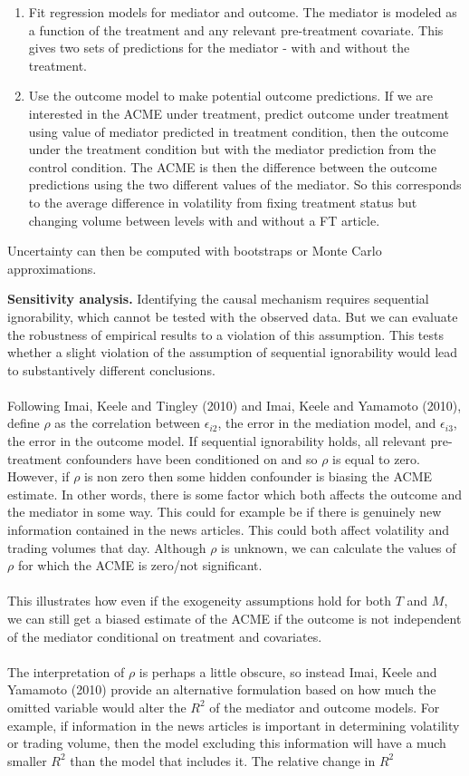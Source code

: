 \documentclass{article}
\begin{document}
	\begin{enumerate}
		\item Fit regression models for mediator and outcome. The mediator is modeled as a function of the treatment and any relevant pre-treatment covariate. This gives two sets of predictions for the mediator - with and without the treatment. 
		\item Use the outcome model to make potential outcome predictions. If we are interested in the ACME under treatment, predict outcome under treatment using value of mediator predicted in treatment condition, then the outcome under the treatment condition but with the mediator prediction from the control condition. The ACME is then the difference between the outcome predictions using the two different values of the mediator. So this corresponds to the average difference in volatility from fixing treatment status but changing volume between levels with and without a FT article.
	\end{enumerate}
	Uncertainty can then be computed with bootstraps or Monte Carlo approximations. 
	
	\textbf{Sensitivity analysis.} Identifying the causal mechanism requires sequential ignorability, which cannot be tested with the observed data. But we can evaluate the robustness of empirical results to a violation of this assumption. This tests whether a slight violation of the assumption of sequential ignorability would lead to substantively different conclusions. 
	\\~\\
	Following Imai, Keele and Tingley (2010) and Imai, Keele and Yamamoto (2010), define $\rho$ as the correlation between $\epsilon_{i2}$, the error in the mediation model, and $\epsilon_{i3}$, the error in the outcome model. If sequential ignorability holds, all relevant pre-treatment confounders have been conditioned on and so $\rho$ is equal to zero. However, if $\rho$ is non zero then some hidden confounder is biasing the ACME estimate. In other words, there is some factor which both affects the outcome and the mediator in some way. This could for example be if there is genuinely new information contained in the news articles. This could both affect volatility and trading volumes that day. Although $\rho$ is unknown, we can calculate the values of $\rho$ for which the ACME is zero/not significant. 
	\\~\\
	This illustrates how even if the exogeneity assumptions hold for both $T$ and $M$, we can still get a biased estimate of the ACME if the outcome is not independent of the mediator conditional on treatment and covariates. 
	\\~\\
	The interpretation of $\rho$ is perhaps a little obscure, so instead Imai, Keele and Yamamoto (2010) provide an alternative formulation based on how much the omitted variable would alter the $R^2$ of the mediator and outcome models. For example, if information in the news articles is important in determining volatility or trading volume, then the model excluding this information will have a much smaller $R^2$ than the model that includes it. The relative change in $R^2$
	
\end{document}
